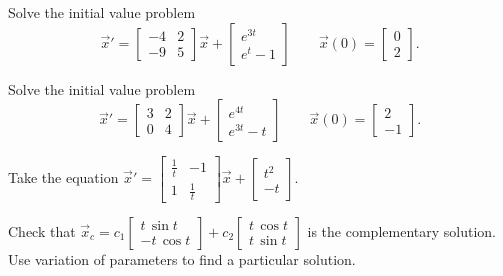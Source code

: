 \begin{exercise}
Solve the initial value problem
\[ {\vec{x}}' = \begin{bmatrix} -4 & 2 \\ -9 & 5 \end{bmatrix}\vec{x} + \begin{bmatrix} e^{3t} \\ e^t - 1 \end{bmatrix} \qquad \vec{x}(0) = \begin{bmatrix} 0 \\ 2 \end{bmatrix}. \]
\end{exercise}

\begin{exercise}
Solve the initial value problem
\[ {\vec{x}}' = \begin{bmatrix} 3 & 2 \\ 0 & 4 \end{bmatrix}\vec{x} + \begin{bmatrix} e^{4t} \\ e^{3t} - t \end{bmatrix} \qquad \vec{x}(0) = \begin{bmatrix} 2 \\ -1 \end{bmatrix}. \]
\end{exercise}

\begin{exercise}
Take the equation
$\displaystyle
{\vec{x}}'
=
\begin{bmatrix}
\frac{1}{t} & -1 \\
1 & \frac{1}{t}
\end{bmatrix}
\vec{x}
+ \begin{bmatrix} t^2 \\ -t \end{bmatrix} .
$
\begin{tasks}
\task
Check that
$\displaystyle
\vec{x}_c =
c_1
\begin{bmatrix}
t\, \sin t \\
- t \, \cos t
\end{bmatrix}
+
c_2
\begin{bmatrix}
t\, \cos t \\
t \, \sin t
\end{bmatrix}
$
is the complementary solution.
\task
Use variation of parameters to
find a particular solution.
\end{tasks}
\end{exercise}

\setcounter{exercise}{100}








